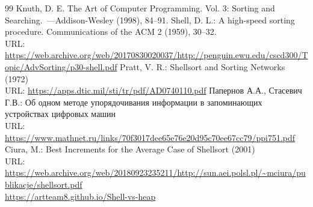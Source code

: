 \documentclass[a4paper,12pt,titlepage,finall]{article}
\begin{document}
\newpage
\begin{raggedright}
\begin{thebibliography}{99}
 Knuth, D. E. The Art of Computer Programming.
    Vol. 3: Sorting and Searching.~---Addison-Wesley (1998), 84--91.
 Shell, D. L.: A high-speed sorting procedure. Communications of the ACM 2
(1959), 30–32.\\
    URL: \url{https://web.archive.org/web/20170830020037/http://penguin.ewu.edu/cscd300/Topic/AdvSorting/p30-shell.pdf}
 Pratt, V. R.: Shellsort and Sorting Networks (1972) \\
    URL: \url{https://apps.dtic.mil/sti/tr/pdf/AD0740110.pdf}
 Папернов А.А., Стасевич Г.В.: Об одном методе упорядочивания информации в запоминающих устройствах цифровых машин \\
    URL: \url{https://www.mathnet.ru/links/70f3017dee65e76e20d95c70ee67cc79/ppi751.pdf}
 Ciura, M.: Best Increments for the Average Case
    of Shellsort (2001) \\
    URL: \url{https://web.archive.org/web/20180923235211/http://sun.aei.polsl.pl/~mciura/publikacje/shellsort.pdf} \\
        \url{https://artteam8.github.io/Shell-vs-heap}
\end{thebibliography}
\end{raggedright}
\end{document}
